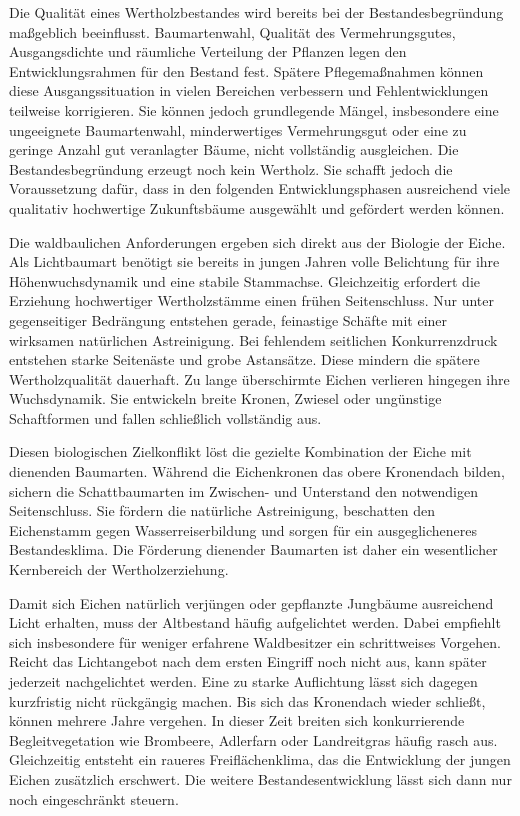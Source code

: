 \documentclass[twocolumn, bibliography=totoc, abstract=true]{scrartcl}
\begin{document}
Die Qualität eines Wertholzbestandes wird bereits bei der Bestandesbegründung maßgeblich beeinflusst. Baumartenwahl, Qualität des Vermehrungsgutes, Ausgangsdichte und räumliche Verteilung der Pflanzen legen den Entwicklungsrahmen für den Bestand fest. Spätere Pflegemaßnahmen können diese Ausgangssituation in vielen Bereichen verbessern und Fehlentwicklungen teilweise korrigieren. Sie können jedoch grundlegende Mängel, insbesondere eine ungeeignete Baumartenwahl, minderwertiges Vermehrungsgut oder eine zu geringe Anzahl gut veranlagter Bäume, nicht vollständig ausgleichen. Die Bestandesbegründung erzeugt noch kein Wertholz. Sie schafft jedoch die Voraussetzung dafür, dass in den folgenden Entwicklungsphasen ausreichend viele qualitativ hochwertige Zukunftsbäume ausgewählt und gefördert werden können.

Die waldbaulichen Anforderungen ergeben sich direkt aus der Biologie der Eiche. Als Lichtbaumart benötigt sie bereits in jungen Jahren volle Belichtung für ihre Höhenwuchsdynamik und eine stabile Stammachse. Gleichzeitig erfordert die Erziehung hochwertiger Wertholzstämme einen frühen Seitenschluss. Nur unter gegenseitiger Bedrängung entstehen gerade, feinastige Schäfte mit einer wirksamen natürlichen Astreinigung. Bei fehlendem seitlichen Konkurrenzdruck entstehen starke Seitenäste und grobe Astansätze. Diese mindern die spätere Wertholzqualität dauerhaft. Zu lange überschirmte Eichen verlieren hingegen ihre Wuchsdynamik. Sie entwickeln breite Kronen, Zwiesel oder ungünstige Schaftformen und fallen schließlich vollständig aus.

Diesen biologischen Zielkonflikt löst die gezielte Kombination der Eiche mit dienenden Baumarten. Während die Eichenkronen das obere Kronendach bilden, sichern die Schattbaumarten im Zwischen- und Unterstand den notwendigen Seitenschluss. Sie fördern die natürliche Astreinigung, beschatten den Eichenstamm gegen Wasserreiserbildung und sorgen für ein ausgeglicheneres Bestandesklima. Die Förderung dienender Baumarten ist daher ein wesentlicher Kernbereich der Wertholzerziehung.

Damit sich Eichen natürlich verjüngen oder gepflanzte Jungbäume ausreichend Licht erhalten, muss der Altbestand häufig aufgelichtet werden. Dabei empfiehlt sich insbesondere für weniger erfahrene Waldbesitzer ein schrittweises Vorgehen. Reicht das Lichtangebot nach dem ersten Eingriff noch nicht aus, kann später jederzeit nachgelichtet werden. Eine zu starke Auflichtung lässt sich dagegen kurzfristig nicht rückgängig machen. Bis sich das Kronendach wieder schließt, können mehrere Jahre vergehen. In dieser Zeit breiten sich konkurrierende Begleitvegetation wie Brombeere, Adlerfarn oder Landreitgras häufig rasch aus. Gleichzeitig entsteht ein raueres Freiflächenklima, das die Entwicklung der jungen Eichen zusätzlich erschwert. Die weitere Bestandesentwicklung lässt sich dann nur noch eingeschränkt steuern.
\end{document}
